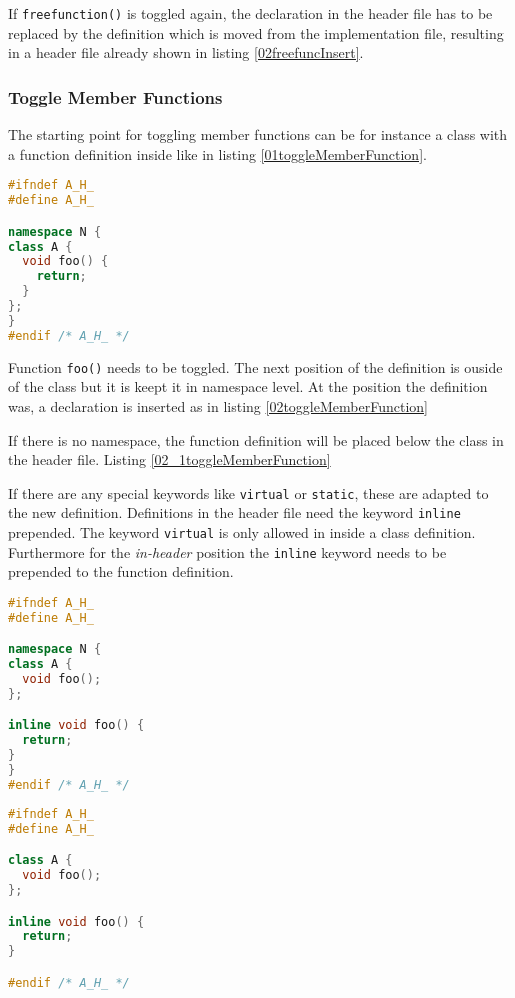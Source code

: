 If \texttt{freefunction()} is toggled again, the declaration in the header file
has to be replaced by the definition which is moved from the implementation
file, resulting in a header file already shown in listing
\nolinebreak\ref{02freefuncInsert}.

\subsubsection{Toggle Member Functions}

The starting point for toggling member functions can be for instance a class
with a function definition inside like in listing
\nolinebreak\ref{01toggleMemberFunction}.

\begin{lstlisting}[caption={A.h, function definition inside class declaration},
label={01toggleMemberFunction}, language=C++]
#ifndef A_H_
#define A_H_

namespace N {
class A {
  void foo() {
    return;
  }
};
}
#endif /* A_H_ */
\end{lstlisting}

Function \texttt{foo()} needs to be toggled. The next position of the
definition is ouside of the class but it is keept it in namespace level. At the
position the definition was, a declaration is inserted as in listing
\ref{02toggleMemberFunction}

If there is no namespace, the function definition will be placed below the
class in the header file. Listing \ref{02_1toggleMemberFunction}

If there are any special keywords like \texttt{virtual} or \texttt{static},
these are adapted to the new definition. Definitions in the header file need
the keyword \texttt{inline} prepended. The keyword \texttt{virtual}
is only allowed in inside a class definition. Furthermore for the
\textit{in-header} position the \texttt{inline} keyword needs to be prepended to
the function definition.

\begin{lstlisting}[caption={A.h,
function definition outside class
definition in header}, label={02toggleMemberFunction}, language=C++]
#ifndef A_H_
#define A_H_

namespace N {
class A {
  void foo();
};

inline void foo() {
  return;
}
}
#endif /* A_H_ */
\end{lstlisting}

\begin{lstlisting}[caption={A.h,
function definition outside class definition without namespace},
label={02_1toggleMemberFunction}, language=C++]
#ifndef A_H_
#define A_H_

class A {
  void foo();
};

inline void foo() {
  return;
}

#endif /* A_H_ */
\end{lstlisting}

